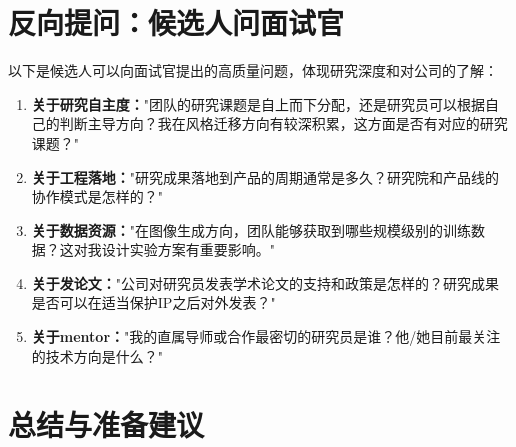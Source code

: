 \documentclass[11pt,a4paper]{article}
\begin{document}
\section{反向提问：候选人问面试官}

以下是候选人可以向面试官提出的高质量问题，体现研究深度和对公司的了解：

\begin{enumerate}
  \item \textbf{关于研究自主度：}"团队的研究课题是自上而下分配，还是研究员可以根据自己的判断主导方向？我在风格迁移方向有较深积累，这方面是否有对应的研究课题？"

  \item \textbf{关于工程落地：}"研究成果落地到产品的周期通常是多久？研究院和产品线的协作模式是怎样的？"

  \item \textbf{关于数据资源：}"在图像生成方向，团队能够获取到哪些规模级别的训练数据？这对我设计实验方案有重要影响。"

  \item \textbf{关于发论文：}"公司对研究员发表学术论文的支持和政策是怎样的？研究成果是否可以在适当保护IP之后对外发表？"

  \item \textbf{关于mentor：}"我的直属导师或合作最密切的研究员是谁？他/她目前最关注的技术方向是什么？"
\end{enumerate}

\section{总结与准备建议}
\end{document}

